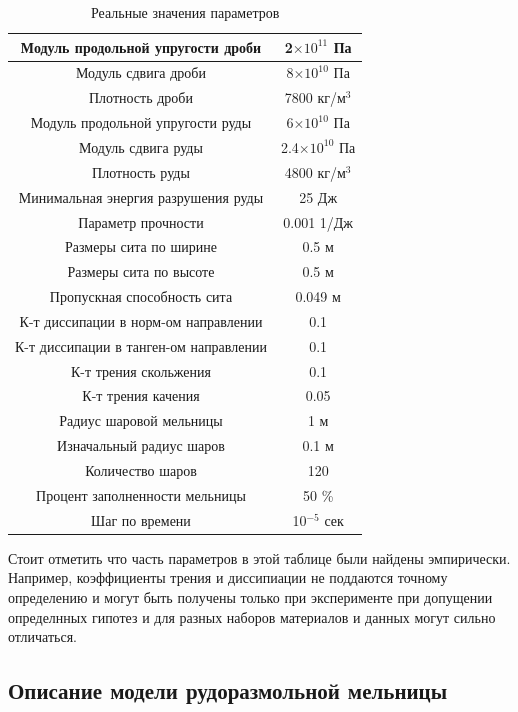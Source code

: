 \documentclass[utf8x, 14pt, oneside, a4paper]{article}
\begin{document}
\begin{table}[H]
\caption{Реальные значения параметров}
\begin{tabular}{|c|c|}
\hline
Модуль продольной упругости дроби & 2$\times 10^{11}$ Па  \\ 
\hline
Модуль сдвига дроби & 8$\times 10^{10}$ Па \\  
\hline
Плотность дроби & 7800 кг/м$^3$ \\
\hline
Модуль продольной упругости руды & 6$\times 10^{10}$ Па  \\ 
\hline
Модуль сдвига руды & 2.4$\times 10^{10}$ Па \\  
\hline
Плотность руды & 4800 кг/м$^3$ \\
\hline
Минимальная энергия разрушения руды & 25 Дж \\
\hline
Параметр прочности & 0.001 1/Дж \\
\hline
Размеры сита по ширине & 0.5 м \\
\hline
Размеры сита по высоте & 0.5 м \\
\hline
Пропускная способность сита & 0.049 м \\
\hline
К-т диссипации в норм-ом направлении & 0.1 \\
\hline
К-т диссипации в танген-ом направлении & 0.1 \\
\hline
К-т трения скольжения & 0.1 \\
\hline
К-т трения качения & 0.05 \\
\hline
Радиус шаровой мельницы & 1 м \\
\hline
Изначальный радиус шаров & 0.1 м \\
\hline
Количество шаров & 120 \\
\hline
Процент заполненности мельницы & 50 \% \\
\hline
Шаг по времени & 10$^{-5}$ сек \\
\hline
\end{tabular}
\end{table}

Стоит отметить что часть параметров в этой таблице были найдены эмпирически. 
Например, коэффициенты трения и диссипиации не поддаются точному определению и могут быть получены только при эксперименте при допущении определнных гипотез и для разных наборов материалов и данных могут сильно отличаться.

\subsection{Описание модели рудоразмольной мельницы}
\end{document}
